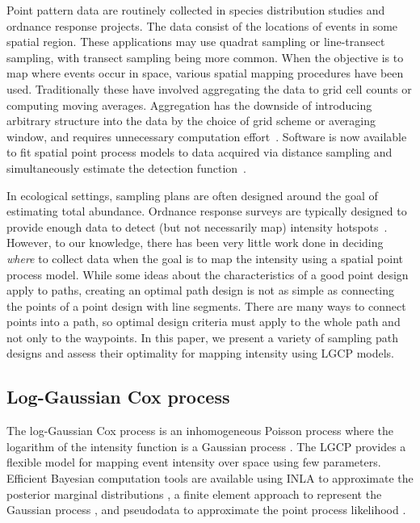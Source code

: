 \documentclass[review]{elsarticle}
\begin{document}
Point pattern data are routinely collected in species distribution studies and
ordnance response projects. The data consist of the locations of events in some
spatial region. These applications may use quadrat sampling or line-transect
sampling, with transect sampling being more common. When the objective is to
map where events occur in space, various spatial mapping procedures have been
used. Traditionally these have involved aggregating the data to grid cell
counts or computing moving averages. Aggregation has the downside of
introducing arbitrary structure into the data by the choice of grid scheme
or averaging window, and requires unnecessary computation
effort~\citep{simpsonetal}. Software is now available to fit spatial point
process models to data acquired via distance sampling and simultaneously
estimate the detection function~\citep{dspat,baser}.

In ecological settings, sampling plans are often designed around the goal of
estimating total abundance. Ordnance response surveys are typically designed
to provide enough data to detect (but not necessarily map) intensity
hotspots~\citep{em200-1-15,flaggetal}. However, to our knowledge, there has
been very little work done in deciding \emph{where} to collect data when the
goal is to map the intensity using a spatial point process model. While some
ideas about the characteristics of a good point design apply to paths, creating
an optimal path design is not as simple as connecting the points of a point
design with line segments. There are many ways to connect points into a path,
so optimal design criteria must apply to the whole path and not only to the
waypoints. In this paper, we present a variety of sampling path designs and
assess their optimality for mapping intensity using LGCP models.


\subsection{Log-Gaussian Cox process}

The log-Gaussian Cox process is an inhomogeneous Poisson process where the
logarithm of the intensity function is a Gaussian process \citep{moelleretal}.
The LGCP provides a flexible model for mapping event intensity over space using
few parameters. Efficient Bayesian computation tools are available using INLA
to approximate the posterior marginal distributions \cite{rueetal}, a finite
element approach to represent the Gaussian process \cite{lindgrenetal}, and
pseudodata to approximate the point process likelihood \cite{simpsonetal}.
\end{document}
